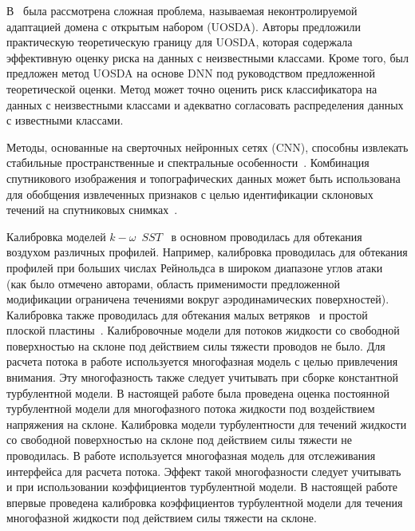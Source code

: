 \documentclass[mathematics,article,accept,pdftex,moreauthors]{Definitions/mdpi}
\begin{document}
В~\cite{ZhongFangLiu2021} была рассмотрена сложная проблема, называемая неконтролируемой адаптацией домена с открытым набором (UOSDA). Авторы предложили практическую теоретическую границу для UOSDA, которая содержала эффективную оценку риска на данных с неизвестными классами. Кроме того, был предложен метод UOSDA на основе DNN под руководством предложенной теоретической оценки. Метод может точно оценить риск классификатора на данных с неизвестными классами и адекватно согласовать распределения данных с известными классами.


Методы, основанные на сверточных нейронных сетях (CNN), способны извлекать стабильные пространственные и спектральные особенности~\cite{Maggiori2017}. Комбинация спутникового изображения и топографических данных может быть использована для обобщения извлеченных признаков с целью идентификации склоновых течений на спутниковых снимках~\cite{Qin2021, Prakash2021}.

Калибровка моделей $k{-}\omega$~$SST$~\cite{Menter1993, Menter1994, MenterKuntzLangtry2003} в основном проводилась для обтекания воздухом различных профилей. Например, калибровка проводилась для обтекания профилей при больших числах Рейнольдса в широком диапазоне углов атаки~\cite{MatyushenkoGarbaruk2016} (как было отмечено авторами, область применимости предложенной модификации ограничена течениями вокруг аэродинамических поверхностей). Калибровка также проводилась для обтекания малых ветряков~\cite{rocha2016case, rocha2014} и простой плоской пластины~\cite{kalitzin2016improvements}.
Калибровочные модели для потоков жидкости со свободной поверхностью на склоне под действием силы тяжести проводов не было. Для расчета потока в работе используется многофазная модель с целью привлечения внимания. Эту многофазность также следует учитывать при сборке константной турбулентной модели. В настоящей работе была проведена оценка постоянной турбулентной модели для многофазного потока жидкости под воздействием напряжения на склоне.
Калибровка модели турбулентности для течений жидкости со свободной поверхностью на склоне под действием силы тяжести не проводилась. В работе используется многофазная модель для отслеживания интерфейса для расчета потока. Эффект такой многофазности следует учитывать и при использовании коэффициентов турбулентной модели. В настоящей работе впервые проведена калибровка коэффициентов турбулентной модели для течения многофазной жидкости под действием силы тяжести на склоне.
\end{document}
